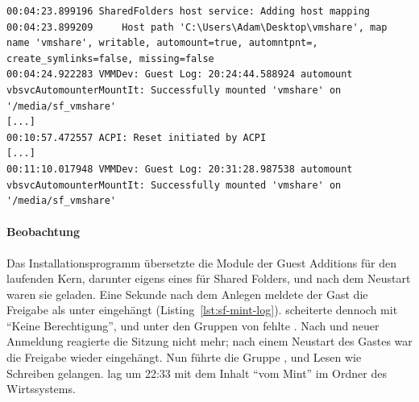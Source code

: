 \begin{messung}
\begin{lstlisting}[caption={Zeilen zur Freigabe aus \texttt{VBox.log} der Linux-VM, Start 22:20:20},label={lst:sf-mint-log}]
00:04:23.899196 SharedFolders host service: Adding host mapping
00:04:23.899209     Host path 'C:\Users\Adam\Desktop\vmshare', map name 'vmshare', writable, automount=true, automntpnt=, create_symlinks=false, missing=false
00:04:24.922283 VMMDev: Guest Log: 20:24:44.588924 automount vbsvcAutomounterMountIt: Successfully mounted 'vmshare' on '/media/sf_vmshare'
[...]
00:10:57.472557 ACPI: Reset initiated by ACPI
[...]
00:11:10.017948 VMMDev: Guest Log: 20:31:28.987538 automount vbsvcAutomounterMountIt: Successfully mounted 'vmshare' on '/media/sf_vmshare'
\end{lstlisting}






\paragraph{Beobachtung} Das Installationsprogramm übersetzte die Module der Guest Additions für den laufenden Kern, darunter eigens eines für Shared Folders, und nach dem Neustart waren sie geladen. Eine Sekunde nach dem Anlegen meldete der Gast die Freigabe als unter  eingehängt (Listing~\ref{lst:sf-mint-log}).  scheiterte dennoch mit \enquote{Keine Berechtigung}, und unter den Gruppen von  fehlte . Nach  und neuer Anmeldung reagierte die Sitzung nicht mehr; nach einem Neustart des Gastes war die Freigabe wieder eingehängt. Nun führte  die Gruppe , und Lesen wie Schreiben gelangen.  lag um 22:33 mit dem Inhalt \enquote{vom Mint} im Ordner des Wirtssystems.


\end{messung}

